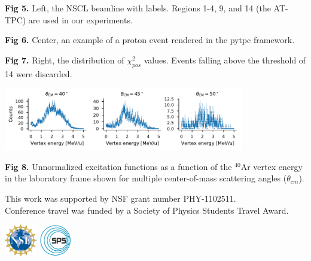 \documentclass[ansiepaperDNP,portrait]{baposterDNP}
\begin{document}
\begin{poster}
{\small{\textbf{Fig 5.} Left, the NSCL beamline with labels. Regions 1-4, 9, and 14 (the AT-TPC) are used in our experiments.}

\small{\textbf{Fig 6.} Center, an example of a proton event rendered in the pytpc framework.}

\small{\textbf{Fig 7.} Right, the distribution of $\chi_{pos}^{2}$ values. Events falling above the threshold of 14 were discarded.}

\begin{center}
\includegraphics [width=105mm] {angular_excitation_hists_POSTER.pdf}
\end{center}
\vspace{-1em}
\small{\textbf{Fig 8.} Unnormalized excitation functions as a function of the $^{40}$Ar vertex energy in the laboratory frame shown for multiple center-of-mass scattering angles ($\theta_{cm}$).}
}

{
\begin{minipage}{0.7\textwidth}
\vspace{-1em}
\small{This work was supported by NSF grant number PHY-1102511.}\\\small{Conference travel was funded by a Society of Physics Students Travel Award.} 
\vspace{-1em}

\end{minipage}
\begin{minipage}{0.3\textwidth}
 \includegraphics [height=14mm]{nsf_logo.png} 
 \hspace{.75cm}
  \includegraphics [height=14mm]{sps_logo.png} \\
  \vspace{-1em}


\end{minipage}}
\end{poster}
\end{document}
